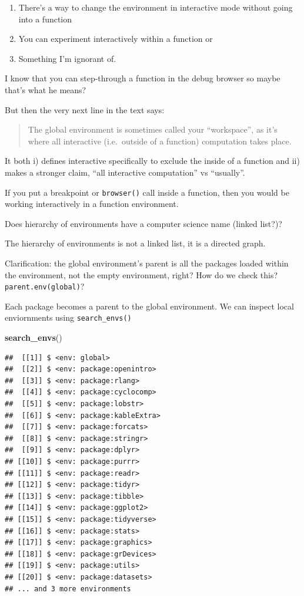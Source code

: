 \documentclass[]{book}
\newenvironment{Shaded}{\begin{snugshade}}{\end{snugshade}}
\newcommand{\KeywordTok}[1]{\textcolor[rgb]{0.13,0.29,0.53}{\textbf{#1}}}
\newcommand{\NormalTok}[1]{#1}
\providecommand{\tightlist}{%
  \setlength{\itemsep}{0pt}\setlength{\parskip}{0pt}}
\begin{document}
\begin{enumerate}
\def\labelenumi{\arabic{enumi}.}
\tightlist
\item
  There's a way to change the environment in interactive mode without going into a function
\item
  You can experiment interactively within a function or
\item
  Something I'm ignorant of.
\end{enumerate}

I know that you can step-through a function in the debug browser so maybe that's what he means?

But then the very next line in the text says:

\begin{quote}
The global environment is sometimes called your ``workspace'', as it's where all interactive (i.e.~outside of a function) computation takes place.
\end{quote}

It both i) defines interactive specifically to exclude the inside of a function and ii) makes a stronger claim, ``all interactive computation'' vs ``usually''.

If you put a breakpoint or \texttt{browser()} call inside a function, then you would be working interactively in a function environment.

Does hierarchy of environments have a computer science name (linked list?)?

The hierarchy of environments is not a linked list, it is a directed graph.

Clarification: the global environment's parent is all the packages loaded within the environment, not the empty environment, right? How do we check this? \texttt{parent.env(global)}?

Each package becomes a parent to the global environment. We can inspect local enviornments using \texttt{search\_envs()}

\begin{Shaded}
\begin{Highlighting}[]
\KeywordTok{search_envs}\NormalTok{()}
\end{Highlighting}
\end{Shaded}

\begin{verbatim}
##  [[1]] $ <env: global>
##  [[2]] $ <env: package:openintro>
##  [[3]] $ <env: package:rlang>
##  [[4]] $ <env: package:cyclocomp>
##  [[5]] $ <env: package:lobstr>
##  [[6]] $ <env: package:kableExtra>
##  [[7]] $ <env: package:forcats>
##  [[8]] $ <env: package:stringr>
##  [[9]] $ <env: package:dplyr>
## [[10]] $ <env: package:purrr>
## [[11]] $ <env: package:readr>
## [[12]] $ <env: package:tidyr>
## [[13]] $ <env: package:tibble>
## [[14]] $ <env: package:ggplot2>
## [[15]] $ <env: package:tidyverse>
## [[16]] $ <env: package:stats>
## [[17]] $ <env: package:graphics>
## [[18]] $ <env: package:grDevices>
## [[19]] $ <env: package:utils>
## [[20]] $ <env: package:datasets>
## ... and 3 more environments
\end{verbatim}
\end{document}
